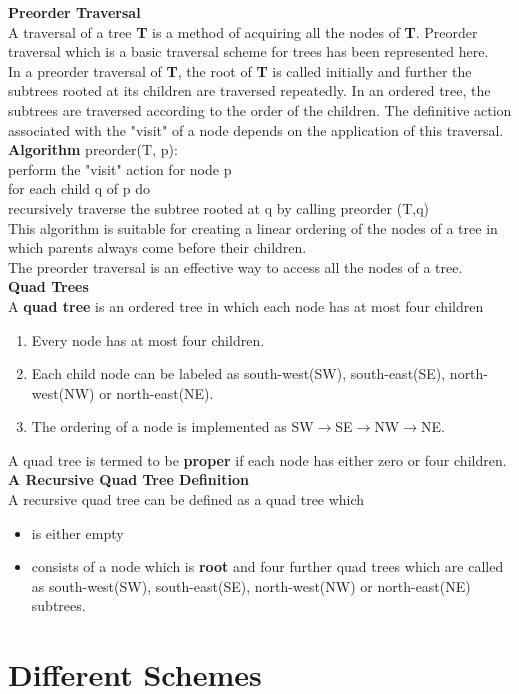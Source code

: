 		
		
		\textbf{Preorder Traversal}\\
		A traversal of a tree \textbf{T} is a method of acquiring all the nodes of \textbf{T}. Preorder traversal which is a basic traversal scheme for trees has been represented here.\\
		In a preorder traversal of \textbf{T}, the root of \textbf{T} is called initially and further the subtrees rooted at its children are traversed repeatedly. In an ordered tree, the subtrees are traversed according to the order of the children. The definitive action associated with the "visit" of a node depends on the application of this traversal.\\
		
		\textbf{Algorithm}  preorder(T, p):\\
		perform the "visit" action for node p\\
		for each child q of p do\\
		recursively traverse the subtree rooted at q by calling preorder (T,q)\\ 
		
		This algorithm is suitable for creating a linear ordering of the nodes of a tree in which parents always come before their children.\\
		
		The preorder traversal is an effective way to access all the nodes of a tree.\\
		
		\textbf{Quad Trees}\\
		A \textbf{quad tree} is an ordered tree in which each node has at most four children
		\begin{enumerate}
			\item Every node has at most four children.
			\item Each child node can be labeled as south-west(SW), south-east(SE), north-west(NW) or north-east(NE).
			\item The ordering of a node is implemented as SW$\rightarrow$SE$\rightarrow$NW$\rightarrow$NE. 
		\end{enumerate}
		A quad tree is termed to be \textbf{proper} if each node has either zero or four children.\\
		
		\textbf{A Recursive Quad Tree Definition}\\
		A recursive quad tree can be defined as a quad tree which
		\begin{itemize}
			\item is either empty
			\item consists of a node which is \textbf{root} and four further quad trees which are called as south-west(SW), south-east(SE), north-west(NW) or north-east(NE) subtrees. 
		\end{itemize}
		 

 
 \section{Different Schemes}
 


